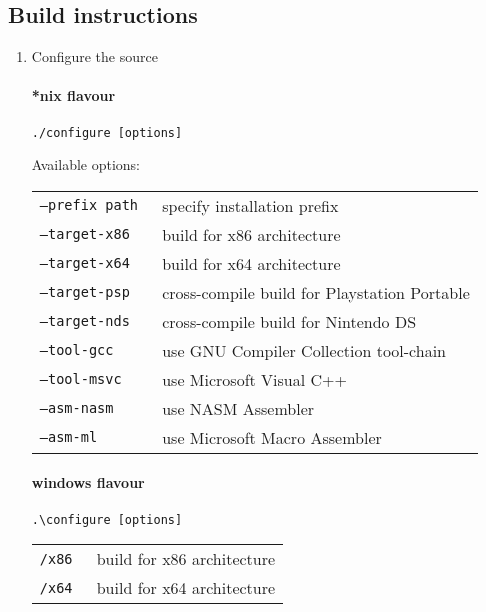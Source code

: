 \pagebreak

\subsection{Build instructions}


\begin{enumerate}
\item Configure the source

\paragraph{*nix flavour}
\begin{lstlisting}
./configure [options]
\end{lstlisting}

Available options:

\begin{tabular}{ll}	
{\tt --prefix path } & specify installation prefix \\
{\tt --target-x86 } & build for x86 architecture \\
{\tt --target-x64 } & build for x64 architecture \\
{\tt --target-psp } & cross-compile build for Playstation Portable \\
{\tt --target-nds } & cross-compile build for Nintendo DS \\
{\tt --tool-gcc } & use GNU Compiler Collection tool-chain \\
{\tt --tool-msvc } & use Microsoft Visual C++ \\
{\tt --asm-nasm } & use NASM Assembler \\
{\tt --asm-ml } & use Microsoft Macro Assembler \\
\end{tabular}


\paragraph{windows flavour}

\begin{lstlisting}
.\configure [options]
\end{lstlisting}

\begin{tabular}{ll}
{\tt /x86 } & build for x86 architecture \\
{\tt /x64 } & build for x64 architecture \\
\end{tabular}


\end{enumerate}

